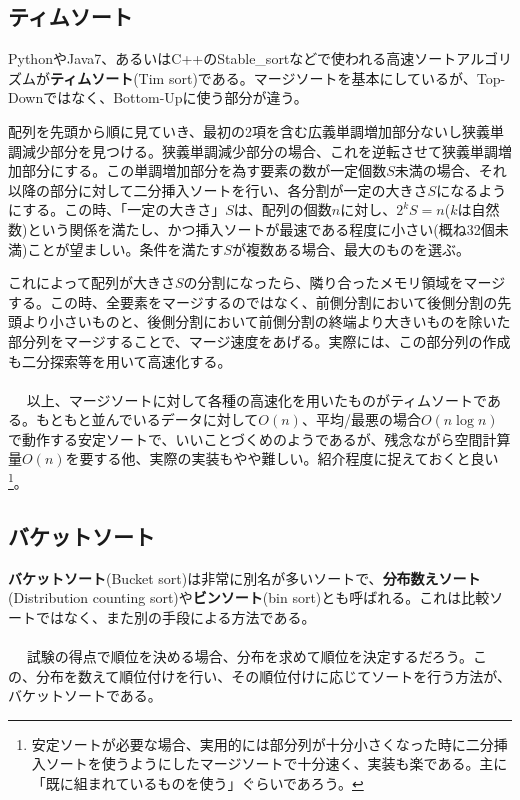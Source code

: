 \subsection{ティムソート}
PythonやJava7、あるいはC++のStable\_sortなどで使われる高速ソートアルゴリズムが\textbf{ティムソート}(Tim sort)である。マージソートを基本にしているが、Top-Downではなく、Bottom-Upに使う部分が違う。

配列を先頭から順に見ていき、最初の2項を含む広義単調増加部分ないし狭義単調減少部分を見つける。狭義単調減少部分の場合、これを逆転させて狭義単調増加部分にする。この単調増加部分を為す要素の数が一定個数$S$未満の場合、それ以降の部分に対して二分挿入ソートを行い、各分割が一定の大きさ$S$になるようにする。この時、「一定の大きさ」$S$は、配列の個数$n$に対し、$2^kS=n$($k$は自然数)という関係を満たし、かつ挿入ソートが最速である程度に小さい(概ね32個未満)ことが望ましい。条件を満たす$S$が複数ある場合、最大のものを選ぶ。

これによって配列が大きさ$S$の分割になったら、隣り合ったメモリ領域をマージする。この時、全要素をマージするのではなく、前側分割において後側分割の先頭より小さいものと、後側分割において前側分割の終端より大きいものを除いた部分列をマージすることで、マージ速度をあげる。実際には、この部分列の作成も二分探索等を用いて高速化する。
\\ \\　
以上、マージソートに対して各種の高速化を用いたものがティムソートである。もともと並んでいるデータに対して$O(n)$、平均/最悪の場合$O(n\log n)$で動作する安定ソートで、いいことづくめのようであるが、残念ながら空間計算量$O(n)$を要する他、実際の実装もやや難しい。紹介程度に捉えておくと良い\footnote{安定ソートが必要な場合、実用的には部分列が十分小さくなった時に二分挿入ソートを使うようにしたマージソートで十分速く、実装も楽である。主に「既に組まれているものを使う」ぐらいであろう。}。

\subsection{バケットソート}
\textbf{バケットソート}(Bucket sort)は非常に別名が多いソートで、\textbf{分布数えソート}(Distribution counting sort)や\textbf{ビンソート}(bin sort)とも呼ばれる。これは比較ソートではなく、また別の手段による方法である。
\\ \\　
試験の得点で順位を決める場合、分布を求めて順位を決定するだろう。この、分布を数えて順位付けを行い、その順位付けに応じてソートを行う方法が、バケットソートである。

